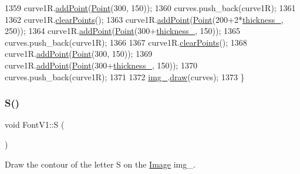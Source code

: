 \begin{DoxyCode}
1359     curve1R.\mbox{\hyperlink{class_bezier_curve_a38d16c18b36ae45619b05e26e226cf34}{addPoint}}(\mbox{\hyperlink{class_point}{Point}}(300, 150));
1360     curves.push\_back(curve1R);
1361 
1362     curve1R.\mbox{\hyperlink{class_bezier_curve_a0ba8ce66d5af5971ae6a1b506029728e}{clearPoints}}();
1363     curve1R.\mbox{\hyperlink{class_bezier_curve_a38d16c18b36ae45619b05e26e226cf34}{addPoint}}(\mbox{\hyperlink{class_point}{Point}}(200+2*\mbox{\hyperlink{class_font_v1_aed8040e76be9a52833627b92f0fb4e5f}{thickness\_}}, 250));
1364     curve1R.\mbox{\hyperlink{class_bezier_curve_a38d16c18b36ae45619b05e26e226cf34}{addPoint}}(\mbox{\hyperlink{class_point}{Point}}(300+\mbox{\hyperlink{class_font_v1_aed8040e76be9a52833627b92f0fb4e5f}{thickness\_}}, 150));
1365     curves.push\_back(curve1R);
1366 
1367     curve1R.\mbox{\hyperlink{class_bezier_curve_a0ba8ce66d5af5971ae6a1b506029728e}{clearPoints}}();
1368     curve1R.\mbox{\hyperlink{class_bezier_curve_a38d16c18b36ae45619b05e26e226cf34}{addPoint}}(\mbox{\hyperlink{class_point}{Point}}(300, 150));
1369     curve1R.\mbox{\hyperlink{class_bezier_curve_a38d16c18b36ae45619b05e26e226cf34}{addPoint}}(\mbox{\hyperlink{class_point}{Point}}(300+\mbox{\hyperlink{class_font_v1_aed8040e76be9a52833627b92f0fb4e5f}{thickness\_}}, 150));
1370     curves.push\_back(curve1R);
1371 
1372     \mbox{\hyperlink{class_font_v1_a00569e3e3c4b70f437b63f396f735fb0}{img\_}}.\mbox{\hyperlink{class_image_a8d162f3cab956131d58708c09aa560b0}{draw}}(curves);
1373 \}
\end{DoxyCode}
\mbox{\label{class_font_v1_ab6daa08377051d5af458003c665cfc09}} 
\subsubsection{\texorpdfstring{S()}{S()}}
{\footnotesize\ttfamily void Font\+V1\+::S (\begin{DoxyParamCaption}{ }\end{DoxyParamCaption})}



Draw the contour of the letter S on the \mbox{\hyperlink{class_image}{Image}} img\+\_\+. 


